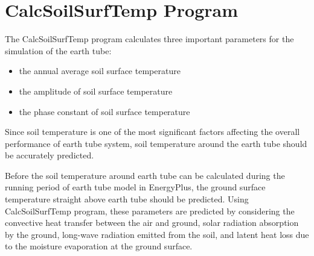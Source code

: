 \chapter{CalcSoilSurfTemp Program}\label{calcsoilsurftemp-program}

The CalcSoilSurfTemp program calculates three important parameters for the simulation of the earth tube:

\begin{itemize}
\item
  the annual average soil surface temperature
\item
  the amplitude of soil surface temperature
\item
  the phase constant of soil surface temperature
\end{itemize}

Since soil temperature is one of the most significant factors affecting the overall performance of earth tube system, soil temperature around the earth tube should be accurately predicted.

Before the soil temperature around earth tube can be calculated during the running period of earth tube model in EnergyPlus, the ground surface temperature straight above earth tube should be predicted. Using CalcSoilSurfTemp program, these parameters are predicted by considering the convective heat transfer between the air and ground, solar radiation absorption by the ground, long-wave radiation emitted from the soil, and latent heat loss due to the moisture evaporation at the ground surface.
